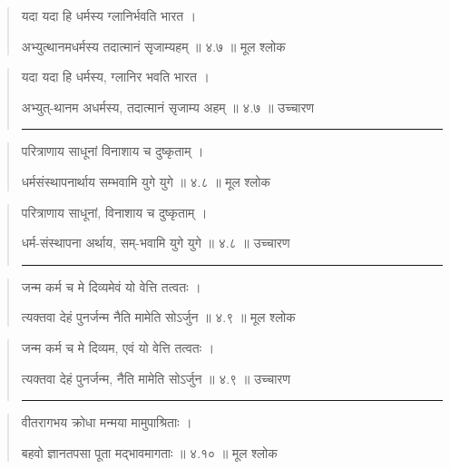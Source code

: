 \begin{quotation}

यदा यदा हि धर्मस्य ग्लानिर्भवति भारत  ।  

अभ्युत्थानमधर्मस्य तदात्मानं सृजाम्यहम्‌  ॥ ४.७ ॥  मूल श्लोक
\end{quotation}

\begin{quotation}

यदा यदा हि धर्मस्य, ग्लानिर भवति भारत  ।  

अभ्युत्-थानम अधर्मस्य, तदात्मानं सृजाम्य अहम्‌  ॥ ४.७ ॥  उच्चारण

\noindent\rule{16cm}{0.4pt} 
\end{quotation}


\begin{quotation}

परित्राणाय साधूनां विनाशाय च दुष्कृताम्‌  ।  

धर्मसंस्थापनार्थाय सम्भवामि युगे युगे  ॥ ४.८ ॥  मूल श्लोक
\end{quotation}

\begin{quotation}

परित्राणाय साधूनां, विनाशाय च दुष्कृताम्‌  ।  

धर्म-संस्थापना अर्थाय, सम्-भवामि युगे युगे  ॥ ४.८ ॥  उच्चारण

\noindent\rule{16cm}{0.4pt} 
\end{quotation}


\begin{quotation}

जन्म कर्म च मे दिव्यमेवं यो वेत्ति तत्वतः  ।  

त्यक्तवा देहं पुनर्जन्म नैति मामेति सोऽर्जुन  ॥ ४.९ ॥  मूल श्लोक
\end{quotation}

\begin{quotation}

जन्म कर्म च मे दिव्यम, एवं यो वेत्ति तत्वतः  ।  

त्यक्तवा देहं पुनर्जन्म, नैति मामेति सोऽर्जुन  ॥ ४.९ ॥  उच्चारण

\noindent\rule{16cm}{0.4pt} 
\end{quotation}


\begin{quotation}

वीतरागभय क्रोधा मन्मया मामुपाश्रिताः  ।  

बहवो ज्ञानतपसा पूता मद्भावमागताः  ॥ ४.१० ॥  मूल श्लोक
\end{quotation}

